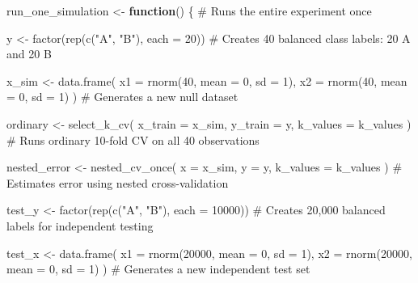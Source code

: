 \documentclass[
  letterpaper,
  DIV=11,
  numbers=noendperiod]{scrreprt}
\newenvironment{Shaded}{\begin{snugshade}}{\end{snugshade}}
\newcommand{\AttributeTok}[1]{\textcolor[rgb]{0.40,0.45,0.13}{#1}}
\newcommand{\CommentTok}[1]{\textcolor[rgb]{0.37,0.37,0.37}{#1}}
\newcommand{\ControlFlowTok}[1]{\textcolor[rgb]{0.00,0.23,0.31}{\textbf{#1}}}
\newcommand{\DecValTok}[1]{\textcolor[rgb]{0.68,0.00,0.00}{#1}}
\newcommand{\FunctionTok}[1]{\textcolor[rgb]{0.28,0.35,0.67}{#1}}
\newcommand{\NormalTok}[1]{\textcolor[rgb]{0.00,0.23,0.31}{#1}}
\newcommand{\OtherTok}[1]{\textcolor[rgb]{0.00,0.23,0.31}{#1}}
\newcommand{\StringTok}[1]{\textcolor[rgb]{0.13,0.47,0.30}{#1}}
\begin{document}
\begin{Shaded}
\begin{Highlighting}[]
\NormalTok{run\_one\_simulation }\OtherTok{\textless{}{-}} \ControlFlowTok{function}\NormalTok{() \{ }\CommentTok{\# Runs the entire experiment once}
  
\NormalTok{  y }\OtherTok{\textless{}{-}} \FunctionTok{factor}\NormalTok{(}\FunctionTok{rep}\NormalTok{(}\FunctionTok{c}\NormalTok{(}\StringTok{"A"}\NormalTok{, }\StringTok{"B"}\NormalTok{), }\AttributeTok{each =} \DecValTok{20}\NormalTok{))}
  \CommentTok{\# Creates 40 balanced class labels: 20 A and 20 B}
  
\NormalTok{  x\_sim }\OtherTok{\textless{}{-}} \FunctionTok{data.frame}\NormalTok{(}
    \AttributeTok{x1 =} \FunctionTok{rnorm}\NormalTok{(}\DecValTok{40}\NormalTok{, }\AttributeTok{mean =} \DecValTok{0}\NormalTok{, }\AttributeTok{sd =} \DecValTok{1}\NormalTok{),}
    \AttributeTok{x2 =} \FunctionTok{rnorm}\NormalTok{(}\DecValTok{40}\NormalTok{, }\AttributeTok{mean =} \DecValTok{0}\NormalTok{, }\AttributeTok{sd =} \DecValTok{1}\NormalTok{)}
\NormalTok{  ) }\CommentTok{\# Generates a new null dataset}
  
\NormalTok{  ordinary }\OtherTok{\textless{}{-}} \FunctionTok{select\_k\_cv}\NormalTok{(}
    \AttributeTok{x\_train =}\NormalTok{ x\_sim,}
    \AttributeTok{y\_train =}\NormalTok{ y,}
    \AttributeTok{k\_values =}\NormalTok{ k\_values}
\NormalTok{  ) }\CommentTok{\# Runs ordinary 10{-}fold CV on all 40 observations}
  
\NormalTok{  nested\_error }\OtherTok{\textless{}{-}} \FunctionTok{nested\_cv\_once}\NormalTok{(}
    \AttributeTok{x =}\NormalTok{ x\_sim,}
    \AttributeTok{y =}\NormalTok{ y,}
    \AttributeTok{k\_values =}\NormalTok{ k\_values}
\NormalTok{  ) }\CommentTok{\# Estimates error using nested cross{-}validation}
  
\NormalTok{  test\_y }\OtherTok{\textless{}{-}} \FunctionTok{factor}\NormalTok{(}\FunctionTok{rep}\NormalTok{(}\FunctionTok{c}\NormalTok{(}\StringTok{"A"}\NormalTok{, }\StringTok{"B"}\NormalTok{), }\AttributeTok{each =} \DecValTok{10000}\NormalTok{))}
  \CommentTok{\# Creates 20,000 balanced labels for independent testing}
  
\NormalTok{  test\_x }\OtherTok{\textless{}{-}} \FunctionTok{data.frame}\NormalTok{(}
    \AttributeTok{x1 =} \FunctionTok{rnorm}\NormalTok{(}\DecValTok{20000}\NormalTok{, }\AttributeTok{mean =} \DecValTok{0}\NormalTok{, }\AttributeTok{sd =} \DecValTok{1}\NormalTok{),}
    \AttributeTok{x2 =} \FunctionTok{rnorm}\NormalTok{(}\DecValTok{20000}\NormalTok{, }\AttributeTok{mean =} \DecValTok{0}\NormalTok{, }\AttributeTok{sd =} \DecValTok{1}\NormalTok{)}
\NormalTok{  ) }\CommentTok{\# Generates a new independent test set}
  

\end{Highlighting}
\end{Shaded}
\end{document}
